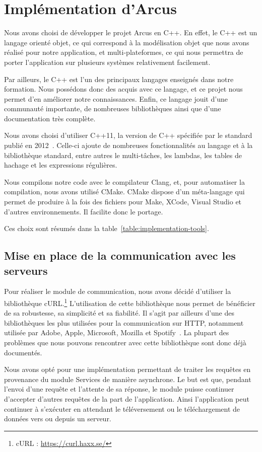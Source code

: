 \chapter{Implémentation d'Arcus}

Nous avons choisi de développer le projet Arcus en C++. En effet, le C++ est un langage orienté objet, ce qui correspond à la modélisation objet que nous avons réalisé pour notre application, et multi-plateformes, ce qui nous permettra de porter l'application sur plusieurs systèmes relativement facilement.

Par ailleurs, le C++ est l'un des principaux langages enseignés dans notre formation. Nous possédons donc des acquis avec ce langage, et ce projet nous permet d'en améliorer notre connaissances. Enfin, ce langage jouit d'une communauté importante, de nombreuses bibliothèques ainsi que d'une documentation très complète.

Nous avons choisi d'utiliser C++11, la version de C++ spécifiée par le standard publié en 2012~\parencite{cpp11}. Celle-ci ajoute de nombreuses fonctionnalités au langage et à la bibliothèque standard, entre autres le multi-tâches, les lambdas, les tables de hachage et les expressions régulières.

Nous compilons notre code avec le compilateur Clang, et, pour automatiser la compilation, nous avons utilisé CMake. CMake dispose d'un méta-langage qui permet de produire à la fois des fichiers pour Make, XCode, Visual Studio et d'autres environnements. Il facilite donc le portage.

Ces choix sont résumés dans la table~\ref{table:implementation-tools}.

\section{Mise en place de la communication avec les serveurs}

Pour réaliser le module de communication, nous avons décidé d'utiliser la bibliothèque cURL.\footnote{cURL : \url{https://curl.haxx.se/}} L'utilisation de cette bibliothèque nous permet de bénéficier de sa robustesse, sa simplicité et sa fiabilité. Il s'agit par ailleurs d'une des bibliothèques les plus utilisées pour la communication sur HTTP, notamment utilisée par Adobe, Apple, Microsoft, Mozilla et Spotify~\parencite{curl-companies}. La plupart des problèmes que nous pouvons rencontrer avec cette bibliothèque sont donc déjà documentés.

Nous avons opté pour une implémentation permettant de traiter les requêtes en provenance du module Services de manière asynchrone. Le but est que, pendant l'envoi d'une requête et l'attente de sa réponse, le module puisse continuer d'accepter d'autres requêtes de la part de l'application. Ainsi l'application peut continuer à s'exécuter en attendant le téléversement ou le téléchargement de données vers ou depuis un serveur.

